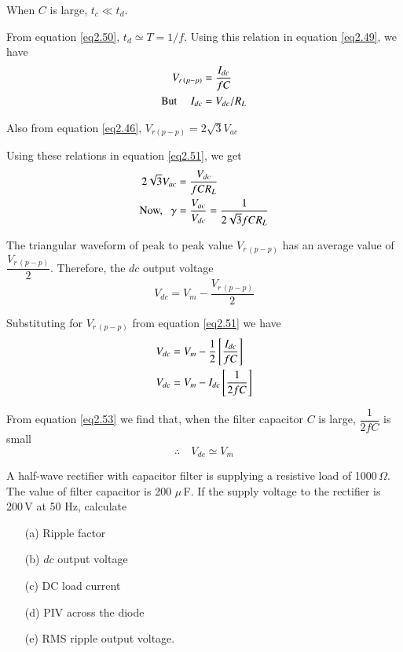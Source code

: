 When $C$ is large, $t_c \ll t_d$.

From equation \eqref{eq2.50}, $t_d \simeq T = 1 /f$. Using this relation in
equation \eqref{eq2.49}, we have
\begin{align}
V_{r\,(p-p)} & = \frac{I_{dc}}{f C} \label{eq2.51}\\
\text{But } \quad I_{dc} & = V_{dc} / R_L \notag
\end{align}

Also from equation \eqref{eq2.46}, $V_{r(p-p)} = 2 \sqrt{3} V_{ac}$

Using these relations in equation \eqref{eq2.51}, we get
\begin{align}
2 \sqrt{3} V_{ac} & = \frac{V_{dc}}{f C R_L} \notag\\
\text{Now, } ~~ \gamma & = \frac{V_{ac}}{V_{dc}} = \frac{1}{2 \sqrt{3}f
C R_L} \label{eq2.52}
\end{align}


The triangular waveform of peak to peak value $V_{r\,(p-p)}$ has an
average value of $\dfrac{V_{r\,(p-p)}}{2}$. Therefore, the $dc$ output
voltage
$$
V_{dc}  = V_m - \frac{V_{r\,(p-p)}}{2}
$$

Substituting for $V_{r\,(p-p)}$ from equation \eqref{eq2.51} we have
\begin{align}
V_{dc} & = V_m - \frac{1}{2} \left[\frac{I_{dc}}{f C} \right] \notag\\
V_{dc} & = V_m - I_{dc} \left[\frac{1}{2 fC} \right] \label{eq2.53}
\end{align}

From equation \eqref{eq2.53} we find that, when the filter capacitor
$C$ is large, $\dfrac{1}{2 fC}$ is small
\begin{equation}
\therefore \quad V_{dc} \simeq V_m \label{eq2.54}
\end{equation}

\begin{example}\label{exam2.14}
A half-wave rectifier with capacitor filter is supplying a resistive
load of 1000\,$\Omega$. The value of filter capacitor is 200 $\mu$\,F. If the supply voltage to the rectifier is \hbox{200\,V} at 50 Hz, calculate
\begin{itemize}
\itemsep=2pt
\item[(a)] Ripple factor

\item[(b)] $dc$ output voltage

\item[(c)] DC load current

\item[(d)] PIV across the diode 

\item[(e)] RMS ripple output voltage.
\end{itemize}
\end{example}

